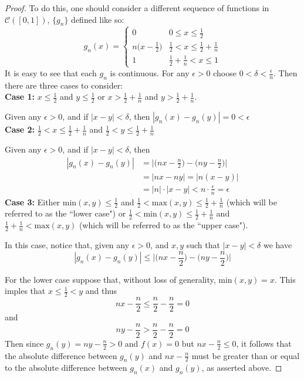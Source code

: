 \documentclass[12pt, letterpaper]{article}
\begin{document}
\begin{proof}
  To do this, one should consider a different sequence of functions in $\mathcal{C}([0,1])$, $\{g_n\}$ defined like so:
  \[
  g_n(x) =
  \begin{cases}
      0 & 0 \leq x \leq \frac{1}{2} \\
      n\big(x - \frac{1}{2}\big) & \frac{1}{2} < x \leq \frac{1}{2} + \frac{1}{n} \\
      1 & \frac{1}{2} + \frac{1}{n} < x \leq 1
   \end{cases}
  \]
  It is easy to see that each $g_n$ is continuous. For any $\epsilon > 0$ choose $0 < \delta < \frac{\epsilon}{n}$. Then there are three cases to consider:\\

  \noindent\textbf{Case 1:} $x \leq \frac{1}{2}$ and $y \leq \frac{1}{2}$ or $x > \frac{1}{2} + \frac{1}{n}$ and $y > \frac{1}{2} + \frac{1}{n}$.

  \noindent Given any $\epsilon > 0$, and if $|x - y| < \delta$, then $|g_n(x) - g_n(y)| = 0 < \epsilon$\\

  \noindent\textbf{Case 2:} $\frac{1}{2} < x \leq \frac{1}{2} + \frac{1}{n}$ and $\frac{1}{2} < y \leq \frac{1}{2} + \frac{1}{n}$

  \noindent Given any $\epsilon > 0$, and if $|x - y| < \delta$, then
  \begin{align*}
    |g_n(x) - g_n(y)| &= \Big|\Big(nx - \frac{n}{2}\Big) - \Big(ny - \frac{n}{2}\Big)\Big|\\
    &= |nx - ny| = |n(x-y)|\\
    &= |n|\cdot|x-y| < n\cdot\frac{\epsilon}{n} = \epsilon
  \end{align*}
  \noindent\textbf{Case 3:} Either $\text{min}(x,y) \leq \frac{1}{2}$ and $\frac{1}{2} < \text{max}(x,y) \leq \frac{1}{2} + \frac{1}{n}$ (which will be referred to as the ``lower case") or $\frac{1}{2} < \text{min}(x,y) \leq \frac{1}{2} + \frac{1}{n}$ and $\frac{1}{2} + \frac{1}{n} < \text{max}(x,y)$ (which will be referred to as the ``upper case").

  In this case, notice that, given any $\epsilon > 0$, and $x, y$ such that $|x - y| < \delta$ we have
  $$ |g_n(x) - g_n(y)| \leq \Big|\Big(nx - \frac{n}{2}\Big) - \Big(ny - \frac{n}{2}\Big)\Big| $$

  For the lower case suppose that, without loss of generality, $\text{min}(x,y) = x$. This imples that $x \leq \frac{1}{2} < y$ and thus
  $$nx - \frac{n}{2} \leq \frac{n}{2} - \frac{n}{2} = 0$$
  and
  $$ny - \frac{n}{2} > \frac{n}{2} - \frac{n}{2} = 0$$
  Then since $g_n(y) = ny - \frac{n}{2} > 0$ and $f(x) = 0$ but $nx - \frac{n}{2} \leq 0$, it follows that the absolute difference between $g_n(y)$ and $nx - \frac{n}{2}$ must be greater than or equal to the absolute difference between $g_n(x)$ and $g_n(y)$, as asserted above.


\end{proof}
\end{document}

